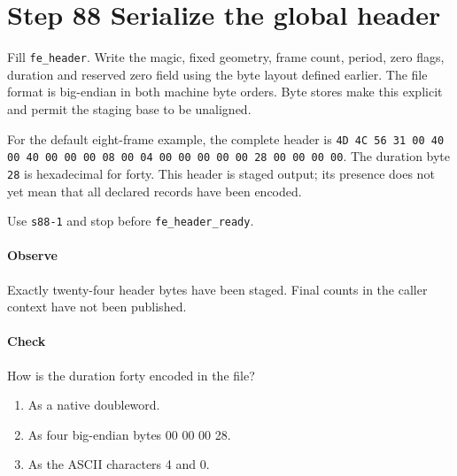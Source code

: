 \section{Step 88 Serialize the global header}
Fill \texttt{fe\_header}. Write the magic, fixed geometry, frame count, period, zero flags, duration and reserved zero field using the byte layout defined earlier. The file format is big-endian in both machine byte orders. Byte stores make this explicit and permit the staging base to be unaligned.

For the default eight-frame example, the complete header is
\texttt{4D 4C 56 31 00 40 00 40 00 00 00 08 00 04 00 00 00 00 00 28 00 00 00 00}.
The duration byte \texttt{28} is hexadecimal for forty. This header is staged output; its presence does not yet mean that all declared records have been encoded.

Use \texttt{s88-1} and stop before \texttt{fe\_header\_ready}.

\paragraph{Observe} Exactly twenty-four header bytes have been staged. Final counts in the caller context have not been published.

\paragraph{Check} How is the duration forty encoded in the file?
\begin{enumerate}[label=\Alph*.]
  \item As a native doubleword.
  \item As four big-endian bytes 00 00 00 28.
  \item As the ASCII characters 4 and 0.
\end{enumerate}
